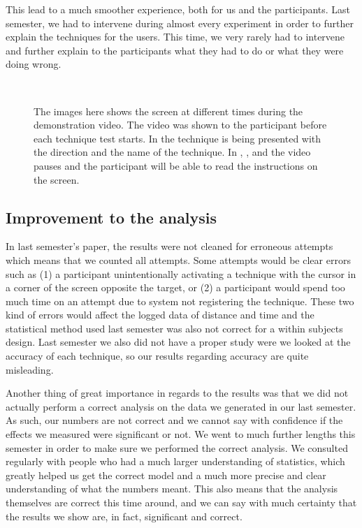 This lead to a much smoother experience, both for us and the participants.
Last semester, we had to intervene during almost every experiment in order to further explain the techniques for the users.
This time, we very rarely had to intervene and further explain to the participants what they had to do or what they were doing wrong.

\begin{figure}[H]
\\
\caption{The images here shows the screen at different times during the demonstration video. The video was shown to the participant before each technique test starts. In \protect{} the technique is being presented with the direction and the name of the technique. In \protect{}, \protect{}, and \protect{} the video pauses and the participant will be able to read the instructions on the screen.}
\label{fig:demovideo}
\end{figure}

\subsection*{Improvement to the analysis}

In last semester's paper, the results were not cleaned for erroneous attempts which means that we counted all attempts. 
Some attempts would be clear errors such as (1) a participant unintentionally activating a technique with the cursor in a corner of the screen opposite the target, or (2) a participant would spend too much time on an attempt due to system not registering the technique.
These two kind of errors would affect the logged data of distance and time and the statistical method used last semester was also not correct for a within subjects design.
Last semester we also did not have a proper study were we looked at the accuracy of each technique, so our results regarding accuracy are quite misleading. 

Another thing of great importance in regards to the results was that we did not actually perform a correct analysis on the data we generated in our last semester.
As such, our numbers are not correct and we cannot say with confidence if the effects we measured were significant or not. 
We went to much further lengths this semester in order to make sure we performed the correct analysis. 
We consulted regularly with people who had a much larger understanding of statistics, which greatly helped us get the correct model and a much more precise and clear understanding of what the numbers meant. 
This also means that the analysis themselves are correct this time around, and we can say with much certainty that the results we show are, in fact, significant and correct.  
